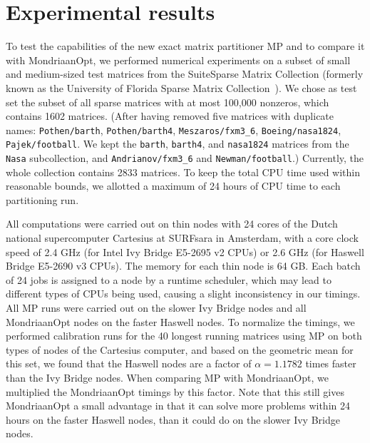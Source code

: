 \section{Experimental results}
\label{sec:experiments}
To test the capabilities of the new exact matrix partitioner MP
and to compare it with MondriaanOpt, we performed numerical experiments
on a subset of small and medium-sized test matrices from the SuiteSparse
Matrix Collection (formerly known as the University
of Florida Sparse Matrix Collection~\cite{davis11}).
We chose as test set the subset of all sparse matrices with at most 100,000 nonzeros,
which contains 1602 matrices. (After having removed five matrices with duplicate names:
	\texttt{Pothen/barth}, \texttt{Pothen/barth4}, \texttt{Meszaros/fxm3\_6},
    \texttt{Boeing/nasa1824}, \texttt{Pajek/football}.
	We kept the \texttt{barth}, \texttt{barth4}, and \texttt{nasa1824} matrices
          from the \texttt{Nasa} subcollection, and  \texttt{Andrianov/fxm3\_6} and
          \texttt{Newman/football}.)
Currently, the whole collection contains 2833 matrices.
To keep the total CPU time used within reasonable bounds, we allotted
a maximum of 24 hours of CPU time to each partitioning run.

All computations were carried out on thin nodes with 24 cores of the Dutch national supercomputer
Cartesius at  SURFsara in Amsterdam, with a core clock speed of 2.4 GHz (for Intel Ivy Bridge E5-2695 v2  CPUs)
or 2.6 GHz (for Haswell Bridge E5-2690 v3 CPUs). The memory for each 
 thin node is 64 GB. Each batch of 24 jobs is assigned to a node by a runtime scheduler,
which may lead to different types of CPUs being used, causing a slight inconsistency in our timings.
All MP runs were carried out on the slower Ivy Bridge nodes and all MondriaanOpt nodes on the faster
Haswell nodes.
To normalize the timings, we performed calibration runs for the 40 longest running matrices
using MP on both types of nodes of the Cartesius computer, and based on the geometric mean for this set,
we found that the Haswell nodes 
are a factor of  $\alpha= 1.1782$ times faster than the Ivy Bridge nodes.
When comparing MP with MondriaanOpt, we multiplied the MondriaanOpt timings
by this factor. Note that this still gives MondriaanOpt a small advantage in that it can solve more problems
within 24 hours on the faster Haswell nodes, than it could do on the slower Ivy Bridge nodes.

